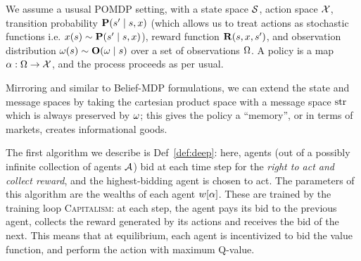 \begin{setup*}[POMDP]
We assume a ususal POMDP setting, with a state space $\mathcal{S}$, action space $\mathcal{X}$, transition probability $\mathbf{P}(s'\mid s,x)$ (which allows us to treat actions as stochastic functions i.e. $x(s)\sim\mathbf{P}(s'\mid s,x)$), reward function $\mathbf{R}(s,x,s')$, and observation distribution $\omega(s)\sim\mathbf{O}(\omega\mid s)$ over a set of observations $\Omega$. A policy is a map $\alpha:\Omega\to\mathcal{X}$, and the process proceeds as per usual.
\label{su:pomdp}
\end{setup*}

Mirroring \cite{kweeMarketBasedReinforcementLearning2001} and similar to Belief-MDP formulations, we can extend the state and message spaces by taking the cartesian product space with a message space $\mathrm{str}$ which is always preserved by $\omega$; this gives the policy a ``memory'', or in terms of markets, creates informational goods. %


The first algorithm we describe is Def~\ref{def:deep}: here, agents (out of a possibly infinite collection of agents $\mathcal{A}$) bid at each time step for the \emph{right to act and collect reward}, and the highest-bidding agent is chosen to act. The parameters of this algorithm are the wealths of each agent $w[\alpha]$. These are trained by the training loop \textsc{Capitalism}: at each step, the agent pays its bid to the previous agent, collects the reward generated by its actions and receives the bid of the next. This means that at equilibrium, each agent is incentivized to bid the value function, and perform the action with maximum Q-value.

